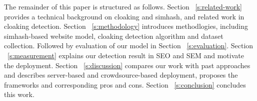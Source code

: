 The remainder of this paper is structured as follows. Section
~\autoref{s:related-work} provides a
technical background on cloaking and simhash, and related work in cloaking
detection. Section ~\autoref{s:methodology} introduces methodlogies, including simhash-based website
model, cloaking detection algorithm and dataset collection.
Followed by evaluation of our model in Section ~\autoref{s:evaluation}.
Section ~\autoref{s:measurement} explains our detection result in SEO and SEM
and motivate the deployment.
Section ~\autoref{s:discussion} compares our work with past approaches and 
describes server-based and crowdsource-based
deployment, proposes the frameworks and corresponding pros and cons. Section
~\autoref{s:conclusion} concludes this work.

